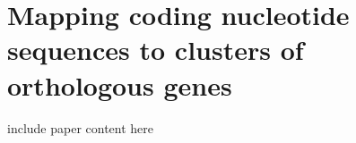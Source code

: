 
\chapter{Mapping coding nucleotide sequences to clusters of orthologous
genes}
\label{orthograph}

include paper content here
